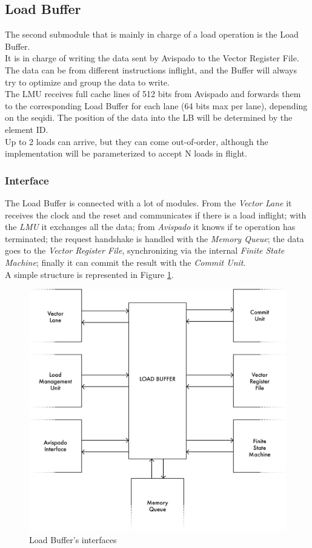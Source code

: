 \subsection{Load Buffer}
The second submodule that is mainly in charge of a load operation is the Load Buffer.\\
It is in charge of writing the data sent by Avispado to the Vector Register File. The data can be from different instructions inflight, and the Buffer will always try to optimize and group the data to write.\\

The LMU receives full cache lines of 512 bits from Avispado and forwards them to the corresponding Load Buffer for each lane (64 bits max per lane), depending on the seq\+id\+i. The position of the data into the LB will be determined by the element ID.\\

Up to 2 loads can arrive, but they can come out-of-order, although the implementation will be parameterized to accept N loads in flight.
\subsubsection{Interface}
The Load Buffer is connected with a lot of modules. From the \emph{Vector Lane} it receives the clock and the reset and communicates if there is a load inflight; with the \emph{LMU} it exchanges all the data; from \emph{Avispado} it knows if te operation has terminated; the request handshake is handled with the \emph{Memory Queue}; the data goes to the \emph{Vector Register File}, synchronizing via the internal \emph{Finite State Machine}; finally it can commit the result with the \emph{Commit Unit}.\\

A simple structure is represented in Figure \ref{lb-if}.

\begin{figure}[H]
    \centering
    \includegraphics[scale = 0.4]{Chapter_2/img/lb-if.png}
    \caption{Load Buffer's interfaces}
    \label{lb-if}
\end{figure}

